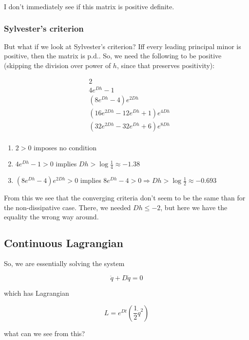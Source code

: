 \documentclass{article}
\begin{document}
I don't immediately see if this matrix is positive definite.

\subsubsection{Sylvester's criterion}

But what if we look at Sylvester's criterion? Iff every leading principal minor is positive, then the matrix is p.d.. So, we need the following to be positive (skipping the division over power of $h$, since that preserves positivity):

\begin{align*}
    & 2 \\
    & 4 e^{D h} - 1 \\
    & \left(8 e^{D h} - 4\right) e^{2 D h} \\
    & \left(16 e^{2 D h} - 12 e^{D h} + 1\right) e^{4 D h} \\
    & \left(32 e^{2 D h} - 32 e^{D h} + 6\right) e^{8 D h} \\
\end{align*}

\begin{enumerate}
    \item $2 > 0$ imposes no condition
    \item $4 e^{D h} - 1 > 0$ implies $D h > \log \frac{1}{4} \approx -1.38$
    \item $\left(8 e^{D h} - 4\right) e^{2 D h} > 0$ implies $8 e^{D h} - 4 > 0 \Rightarrow D h > \log \frac{1}{2} \approx -0.693$
\end{enumerate}

From this we see that the converging criteria don't seem to be the same than for the non-dissipative case. There, we needed $Dh \leq -2$, but here we have the equality the wrong way around.

\subsection{Continuous Lagrangian}

So, we are essentially solving the system

\[
    \ddot{q} + D \dot{q} = 0
\]

which has Lagrangian

\[
    L = e^{D t} \left(\frac{1}{2} \dot{q}^2\right)
\]

what can we see from this?



\break
\printbibliography
\end{document}
